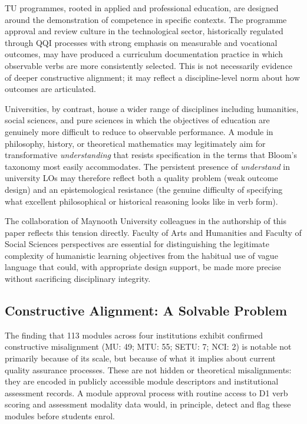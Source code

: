 \documentclass[12pt, a4paper]{article}
\begin{document}
TU programmes, rooted in applied and professional education, are designed around the
demonstration of competence in specific contexts. The programme approval and review
culture in the technological sector, historically regulated through QQI processes
with strong emphasis on measurable and vocational outcomes, may have produced a
curriculum documentation practice in which observable verbs are more consistently
selected. This is not necessarily evidence of deeper constructive alignment; it may
reflect a discipline-level norm about how outcomes are articulated.

Universities, by contrast, house a wider range of disciplines including humanities,
social sciences, and pure sciences in which the objectives of education are
genuinely more difficult to reduce to observable performance. A module in philosophy,
history, or theoretical mathematics may legitimately aim for transformative
\textit{understanding} that resists specification in the terms that Bloom's taxonomy
most easily accommodates. The persistent presence of \textit{understand} in university
LOs may therefore reflect both a quality problem (weak outcome design) and an
epistemological resistance (the genuine difficulty of specifying what excellent
philosophical or historical reasoning looks like in verb form).

The collaboration of Maynooth University colleagues in the authorship of this paper
reflects this tension directly. Faculty of Arts and Humanities and Faculty of Social
Sciences perspectives are essential for distinguishing the legitimate complexity of
humanistic learning objectives from the habitual use of vague language that could,
with appropriate design support, be made more precise without sacrificing
disciplinary integrity.

\subsection{Constructive Alignment: A Solvable Problem}

The finding that 113 modules across four institutions exhibit confirmed constructive
misalignment (MU: 49; MTU: 55; SETU: 7; NCI: 2) is notable not primarily because of
its scale, but because of what it implies about current quality assurance processes. These are not hidden or theoretical
misalignments: they are encoded in publicly accessible module descriptors and
institutional assessment records. A module approval process with routine access to
D1 verb scoring and assessment modality data would, in principle, detect and flag
these modules before students enrol.
\end{document}
